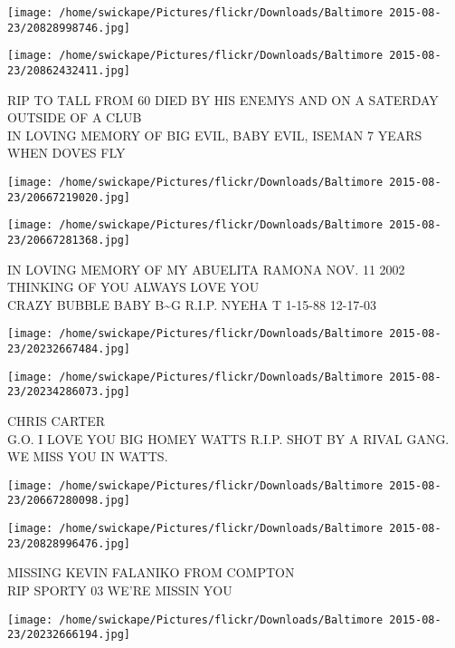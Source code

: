 \documentclass[10pt,letterpaper]{article}
\begin{document}
\texttt{[image: /home/swickape/Pictures/flickr/Downloads/Baltimore 2015-08-23/20828998746.jpg]}

\vspace{0.25in}
\texttt{[image: /home/swickape/Pictures/flickr/Downloads/Baltimore 2015-08-23/20862432411.jpg]}

RIP TO TALL FROM 60 DIED BY HIS ENEMYS AND ON A SATERDAY OUTSIDE OF A CLUB\\
IN LOVING MEMORY OF BIG EVIL, BABY EVIL, ISEMAN 7 YEARS WHEN DOVES FLY\\
\pagebreak

\texttt{[image: /home/swickape/Pictures/flickr/Downloads/Baltimore 2015-08-23/20667219020.jpg]}

\vspace{0.25in}
\texttt{[image: /home/swickape/Pictures/flickr/Downloads/Baltimore 2015-08-23/20667281368.jpg]}

IN LOVING MEMORY OF MY ABUELITA RAMONA NOV. 11 2002 THINKING OF YOU ALWAYS LOVE YOU\\
CRAZY BUBBLE BABY B\textasciitilde{}G R.I.P. NYEHA T 1{-}15{-}88 12{-}17{-}03\\
\pagebreak

\texttt{[image: /home/swickape/Pictures/flickr/Downloads/Baltimore 2015-08-23/20232667484.jpg]}

\vspace{0.25in}
\texttt{[image: /home/swickape/Pictures/flickr/Downloads/Baltimore 2015-08-23/20234286073.jpg]}

CHRIS CARTER\\
G.O. I LOVE YOU BIG HOMEY WATTS R.I.P.  SHOT BY A RIVAL GANG.  WE MISS YOU IN WATTS.\\
\pagebreak

\texttt{[image: /home/swickape/Pictures/flickr/Downloads/Baltimore 2015-08-23/20667280098.jpg]}

\vspace{0.25in}
\texttt{[image: /home/swickape/Pictures/flickr/Downloads/Baltimore 2015-08-23/20828996476.jpg]}

MISSING KEVIN FALANIKO FROM COMPTON\\
RIP SPORTY 03 WE'RE MISSIN YOU\\
\pagebreak

\texttt{[image: /home/swickape/Pictures/flickr/Downloads/Baltimore 2015-08-23/20232666194.jpg]}
\end{document}
